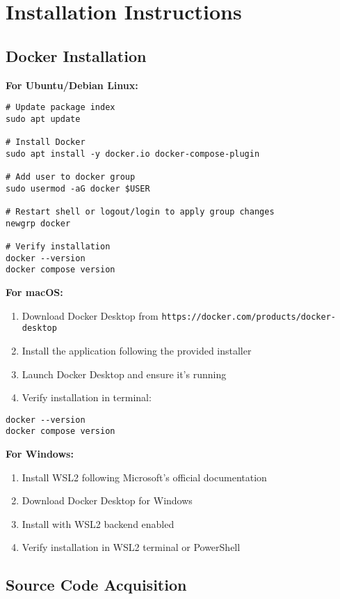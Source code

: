 \section{Installation Instructions}

\subsection{Docker Installation}

\textbf{For Ubuntu/Debian Linux:}
\begin{verbatim}
# Update package index
sudo apt update

# Install Docker
sudo apt install -y docker.io docker-compose-plugin

# Add user to docker group
sudo usermod -aG docker $USER

# Restart shell or logout/login to apply group changes
newgrp docker

# Verify installation
docker --version
docker compose version
\end{verbatim}

\textbf{For macOS:}
\begin{enumerate}
    \item Download Docker Desktop from \texttt{https://docker.com/products/docker-desktop}
    \item Install the application following the provided installer
    \item Launch Docker Desktop and ensure it's running
    \item Verify installation in terminal:
\end{enumerate}
\begin{verbatim}
docker --version
docker compose version
\end{verbatim}

\textbf{For Windows:}
\begin{enumerate}
    \item Install WSL2 following Microsoft's official documentation
    \item Download Docker Desktop for Windows
    \item Install with WSL2 backend enabled
    \item Verify installation in WSL2 terminal or PowerShell
\end{enumerate}

\subsection{Source Code Acquisition}

